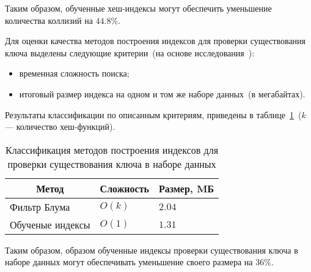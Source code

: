Таким образом, обученные хеш-индексы могут обеспечить уменьшение количества
коллизий на $44.8\%$.

Для оценки качества методов построения индексов для проверки существования ключа
выделены следующие критерии~(на основе исследования~\cite{main}):
\begin{itemize}
    \item временная сложность поиска;
    \item итоговый размер индекса на одном и том же наборе данных~(в мегабайтах).
\end{itemize}

Результаты классификации по описанным критериям, приведены в
таблице~\ref{tab:03}~($k$ --- количество хеш-функций).

{
\captionsetup{format=hang,justification=raggedleft,
              singlelinecheck=off,width=12cm}
\begin{longtable}[Hc]{|p{5.3cm}|p{2cm}|p{2cm}|}
\caption{Классификация методов построения индексов для проверки существования
ключа в наборе данных\label{tab:03}}\\
    \hline
    \multicolumn{1}{|c|}{\textbf{Метод}} &
    \multicolumn{1}{c|}{\textbf{Сложность}} &
    \multicolumn{1}{c|}{\textbf{Размер, MБ}}\\
    \hline
    Фильтр Блума
    & $O(k)$
    & $2.04$\\
    \hline
    Обученые индексы
    & $O(1)$
    & $1.31$\\
    \hline
\end{longtable}
}

Таким образом, образом обученные индексы проверки существования ключа в наборе
данных могут обеспечивать уменьшение своего размера на $36\%$.

